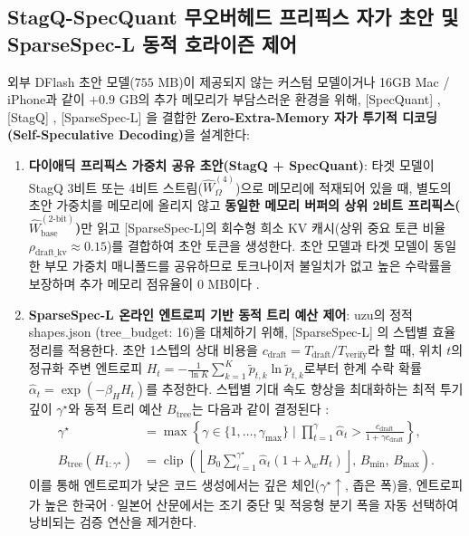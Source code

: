 \documentclass[10pt,a4paper]{article}
\begin{document}
\subsection{\textsf{StagQ-SpecQuant} 무오버헤드 프리픽스 자가 초안 및 \textsf{SparseSpec-L} 동적 호라이즌 제어}
외부 \textsf{DFlash} 초안 모델($755\text{ MB}$)이 제공되지 않는 커스텀 모델이거나 16GB Mac / iPhone과 같이 $+0.9\text{ GB}$의 추가 메모리가 부담스러운 환경을 위해, [SpecQuant] \cite{specquant2026}, [StagQ] \cite{wei2026stagq}, [SparseSpec-L] \cite{liu2026sparsespec}을 결합한 \textbf{Zero-Extra-Memory 자가 투기적 디코딩(Self-Speculative Decoding)}을 설계한다:
\begin{enumerate}\setlength{\itemsep}{2pt}\setlength{\parskip}{0pt}
  \item \textbf{다이애딕 프리픽스 가중치 공유 초안(\textsf{StagQ} + \textsf{SpecQuant})}: 타겟 모델이 \textsf{StagQ} 3비트 또는 4비트 스트림($\widehat{W}_{\Omega}^{(4)}$)으로 메모리에 적재되어 있을 때, 별도의 초안 가중치를 메모리에 올리지 않고 \textbf{동일한 메모리 버퍼의 상위 2비트 프리픽스($\widehat{W}_{\text{base}}^{(2\text{-bit})}$)}만 읽고 [SparseSpec-L]의 회수형 희소 KV 캐시(상위 중요 토큰 비율 $\rho_{\text{draft\_kv}} \approx 0.15$)를 결합하여 초안 토큰을 생성한다. 초안 모델과 타겟 모델이 동일한 부모 가중치 매니폴드를 공유하므로 토크나이저 불일치가 없고 높은 수락률을 보장하며 추가 메모리 점유율이 $0\text{ MB}$이다 \cite{specquant2026,wei2026stagq}.
  \item \textbf{\textsf{SparseSpec-L} 온라인 엔트로피 기반 동적 트리 예산 제어}: \textsf{uzu}의 정적 \textsf{shapes.json} (\textsf{tree\_budget: 16})을 대체하기 위해, [SparseSpec-L] \cite{liu2026sparsespec}의 스텝별 효율 정리를 적용한다. 초안 1스텝의 상대 비용을 $c_{\text{draft}} = T_{\text{draft}} / T_{\text{verify}}$라 할 때, 위치 $t$의 정규화 주변 엔트로피 $H_t = -\frac{1}{\ln K}\sum_{k=1}^K \tilde{p}_{t,k} \ln \tilde{p}_{t,k}$로부터 한계 수락 확률 $\hat{\alpha}_t = \exp(-\beta_H H_t)$를 추정한다. 스텝별 기대 속도 향상을 최대화하는 최적 투기 깊이 $\gamma^\star$와 동적 트리 예산 $B_{\text{tree}}$는 다음과 같이 결정된다 \cite{liu2026sparsespec}:
  \begin{align}
  \gamma^\star &= \max \left\{ \gamma \in \{1, \dots, \gamma_{\max}\} \;\Big|\; \prod_{t=1}^{\gamma} \hat{\alpha}_t > \frac{c_{\text{draft}}}{1 + \gamma c_{\text{draft}}} \right\}, \label{eq:sparsespec_controller} \\
  B_{\text{tree}}(H_{1:\gamma^\star}) &= \operatorname{clip}\!\left( \left\lfloor B_0 \sum_{t=1}^{\gamma^\star} \hat{\alpha}_t (1 + \lambda_w H_t) \right\rfloor, \, B_{\min}, \, B_{\max} \right). \nonumber
  \end{align}
  이를 통해 엔트로피가 낮은 코드 생성에서는 깊은 체인($\gamma^\star \uparrow$, 좁은 폭)을, 엔트로피가 높은 한국어·일본어 산문에서는 조기 중단 및 적응형 분기 폭을 자동 선택하여 낭비되는 검증 연산을 제거한다.
\end{enumerate}
\end{document}

